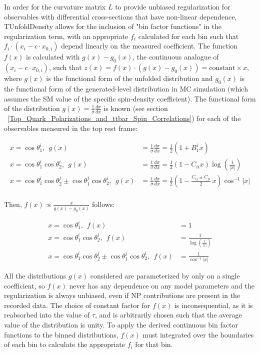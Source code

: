 In order for the curvature matrix $L$ to provide unbiased regularization for observables with differential cross-sections that have non-linear dependence, TUnfoldDensity allows for the inclusion of "bin factor functions" in the regularization term, with an appropriate $f_i$ calculated for each bin such that $f_i \cdot (x_i - c \cdot x_{0,i})$ depend linearly on the measured coefficient. 
The function $f(x)$ is calculated with $g(x) - g_{0}(x)$, the continuous analogue of $(x_i - c \cdot x_{0,i})$, such that $z(x) = f(x) \cdot (g(x) - g_{0}(x)) = \mathrm{constant} \times x$, where $g(x)$ is the functional form of the unfolded distribution and $g_{0}(x)$ is the functional form of the generated-level distribution in MC simulation (which assumes the SM value of the specific spin-density coefficient).
The functional form of the distribution $g(x) = \tfrac{1}{\sigma}\tfrac{d\sigma}{dx}$ is known (see section ~\ref{Top_Quark_Polarizations_and_ttbar_Spin_Correlations}) for each of the observables measured in the top rest frame:
\begin{linenomath*}
\begin{align}
x=\cos\theta_1^i, \:\: g(x) &= \frac{1}{\sigma}\frac{d\sigma}{dx} = \frac{1}{2} (1+B_1^{i} x) \\ 
x=\cos\theta_1^i\cos\theta_2^i, \:\: g(x) &= \frac{1}{\sigma}\frac{d\sigma}{dx} = \frac{1}{2} (1-C_{ii} x) \log \left(\frac{1}{\left \vert x \right \vert }\right) \\ 
x=\cos\theta_1^i\cos\theta_2^j\pm \cos\theta_1^j\cos\theta_2^i, \:\: g(x) &= \frac{1}{\sigma}\frac{d\sigma}{dx} = \frac{1}{2} \left( 1 - \frac{C_{ij} \pm C_{ji}}{2} \, x \right)  \cos ^{-1}\left \vert x \right \vert \\
\end{align}
\end{linenomath*}
Then, $f(x) \propto \frac{x}{g(x)-g_{0}(x)}$ follows:
\begin{linenomath*}
\begin{align}
x=\cos\theta_1^i, \:\: f(x) &= 1 \\
x=\cos\theta_1^i\cos\theta_2^i, \:\: f(x) &= \frac{1}{\log \left(\frac{1}{\left\vert x \right \vert }\right)} \\
x=\cos\theta_1^i\cos\theta_2^j\pm \cos\theta_1^j\cos\theta_2^i, \:\: f(x) &=  \frac{1}{\cos ^{-1}\left \vert x \right \vert}
\end{align}
\end{linenomath*}
All the distributions $g(x)$ considered are parameterized by only on a single coefficient, so $f(x)$ never has any dependence on any model parameters and the regularization is always unbiased, even if NP contributions are present in the recorded data. 
The choice of constant factor for $f(x)$ is inconsequential, as it is reabsorbed into the value of $\tau$, and is arbitrarily chosen such that the average value of the distribution is unity.
To apply the derived continuous bin factor functions to the binned distributions, $f(x)$ must integrated over the boundaries of each bin to calculate the appropriate $f_i$ for that bin. 

